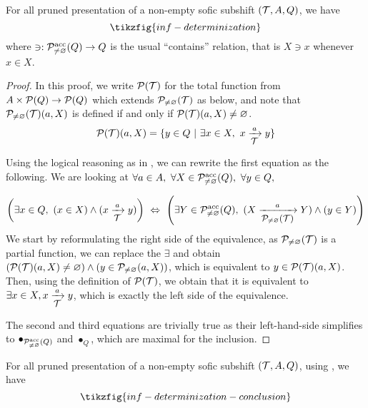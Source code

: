 \begin{proposition}\label{prop:determinization-inf}
	For all pruned presentation of a non-empty sofic subshift $(\T,A,Q)$, we have
	\[ \tikzfig{inf-determinization}\]
	where $\ni : \Pne^{\textup{acc}}(Q) \to Q$ is the usual ``contains'' relation, that is $X \ni x$ whenever $x \in X$.
\end{proposition}
\begin{proof}
	In this proof, we write $\P(\T)$ for the total function from $A \times \P(Q) \to \P(Q)$ which extends $\Pne(\T)$ as below, and note that $\Pne(\T)(a,X)$ is defined if and only if $\P(\T)(a,X) \neq \varnothing$.
	\[ \P(\T)(a,X)=\{y\in Q ~|~ \exists x\in X,~  x \xrightarrow[\text{\small $\T$}]{a} y \} \]
	
	Using the logical reasoning as in , we can rewrite the first equation as the following. We are looking at $\forall a\in A,~ \forall X\in \Pne^{\textup{acc}}(Q),~\forall y\in Q,~$
	
	\[ \left(\exists x\in Q,~ (x\in X) \land (x \xrightarrow[\text{\small$\T$}]{a} y)\right) ~\Leftrightarrow~ \left(\exists Y\in \Pne^{\textup{acc}}(Q),~   (X \xrightarrow[\text{\small$\Pne(\T)$}]{a} Y) \land (y\in Y)\right)\]
	We start by reformulating the right side of the equivalence, as $\Pne(\T)$ is a partial function, we can replace the $\exists$ and obtain $(\P(\T)(a,X) \neq \varnothing) \land (y \in \Pne(a,X))$, which is equivalent to $y \in \P(\T)(a,X)$. Then, using the definition of $ \P(\T)$, we obtain that it is equivalent to $\exists x \in X, x \xrightarrow[\text{\small$\T$}]{a} y$, which is exactly the left side of the equivalence. 
	
	The second and third equations are trivially true as their left-hand-side simplifies to $\bullet_{\Pne^{\textup{acc}}(Q)}$ and $\bullet_{Q}$, which are maximal for the inclusion.
\end{proof}

\begin{corollary}\label{appcor:determinization-inf}
	For all pruned presentation of a non-empty sofic subshift $(\T,A,Q)$, using , we have
	\[ \tikzfig{inf-determinization-conclusion}\]
\end{corollary}

